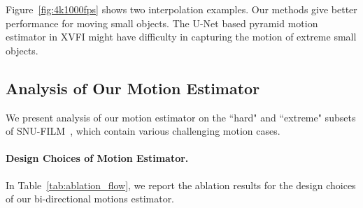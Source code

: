 \documentclass[10pt,twocolumn,letterpaper]{article}
\begin{document}
Figure~\ref{fig:4k1000fps} shows two interpolation examples. Our methods give
better performance for moving small objects. The U-Net based pyramid motion
estimator in XVFI might have difficulty in capturing the motion of extreme small
objects.



\subsection{Analysis of Our Motion Estimator} We present analysis of our motion
estimator on the ``hard" and ``extreme" subsets of
SNU-FILM~\cite{choi2020channel}, which contain various challenging motion cases.



\paragraph{Design Choices of Motion Estimator.} In
Table~\ref{tab:ablation_flow}, we report the ablation results for the design
choices of our bi-directional motions estimator.
\end{document}
